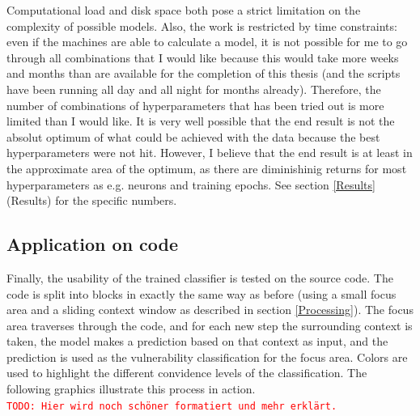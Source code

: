 \documentclass[
a4paper,
pagesize,
pdftex,
12pt,
twoside, %
BCOR=5mm, %
ngerman,
fleqn,
final,
]{scrartcl}
\begin{document}
	Computational load and disk space both pose a strict limitation on the complexity of possible models. Also, the work is restricted by time constraints: even if the machines are able to calculate a model, it is not possible for me to go through all combinations that I would like because this would take more weeks and months than are available for the completion of this thesis (and the scripts have been running all day and all night for months already). Therefore, the number of combinations of hyperparameters that has been tried out is more limited than I would like. It is very well possible that the end result is not the absolut optimum of what could be achieved with the data because the best hyperparameters were not hit. However, I believe that the end result is at least in the approximate area of the optimum, as there are diminishinig returns for most hyperparameters as e.g. neurons and training epochs. See section \ref{Results} (Results) for the specific numbers. 
	
	\subsection{Application on code}
	Finally, the usability of the trained classifier is tested on the source code. The code is split into blocks in exactly the same way as before (using a small focus area and a sliding context window as described in section \ref{Processing}). The focus area traverses through the code, and for each new step the surrounding context is taken, the model makes a prediction based on that context as input, and the prediction is used as the vulnerability classification for the focus area. Colors are used to highlight the different convidence levels of the classification. The following graphics illustrate this process in action. \\
	
	\textcolor{red}{\texttt{TODO: Hier wird noch schöner formatiert und mehr erklärt.}}
	
\end{document}

